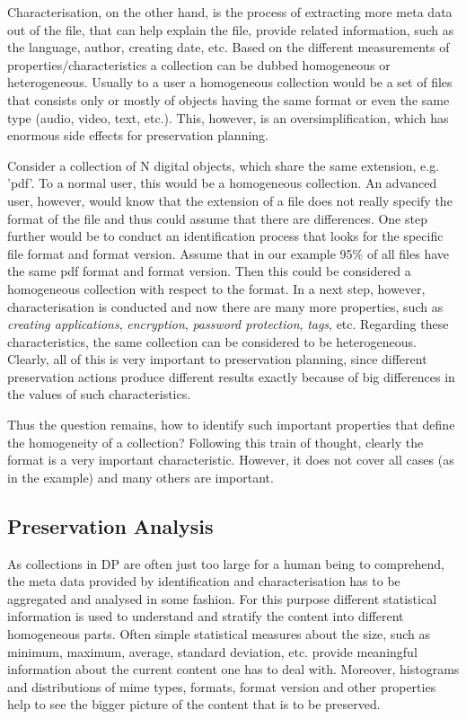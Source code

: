 Characterisation, on the other hand, is the process of extracting more meta data out of the file, that can help explain the file, provide related information, such as the language, author, creating date, etc. Based on the different measurements of properties/characteristics a collection can be dubbed homogeneous or heterogeneous. Usually to a user a homogeneous collection would be a set of files that consists only or mostly of objects having the same format or even the same type (audio, video, text, etc.). This, however, is an oversimplification, which has enormous side effects for preservation planning.

Consider a collection of N digital objects, which share the same extension, e.g. 'pdf'. To a normal user, this would be a homogeneous collection. An advanced user, however, would know that the extension of a file does not really specify the format of the file and thus could assume that there are differences.
One step further would be to conduct an identification process that looks for the specific file format and format version. Assume that in our example 95\% of all files have the same pdf format and format version.  Then this could be considered a homogeneous collection with respect to the format.  In a next step, however, characterisation is conducted and now there are many more properties, such as \textit{creating applications}, \textit{encryption}, \textit{password protection}, \textit{tags}, etc.
Regarding these characteristics, the same collection can be considered to be heterogeneous.
Clearly, all of this is very important to preservation planning, since different preservation actions produce different results exactly because of big differences in the values of such characteristics.

Thus the question remains, how to identify such important properties that define the homogeneity of a collection? Following this train of thought, clearly the format is a very important characteristic. However, it does not cover all cases (as in the example) and many others are important.

\subsection{Preservation Analysis}
As collections in DP are often just too large for a human being to comprehend, the meta data provided by identification and characterisation has to be aggregated and analysed in some fashion. For this purpose different statistical information is used to understand and stratify the content into different homogeneous parts. Often simple statistical measures about the size, such as minimum, maximum, average, standard deviation, etc. provide meaningful information about the current content one has to deal with. Moreover, histograms and distributions of mime types, formats, format version and other properties help to see the bigger picture of the content that is to be preserved.

